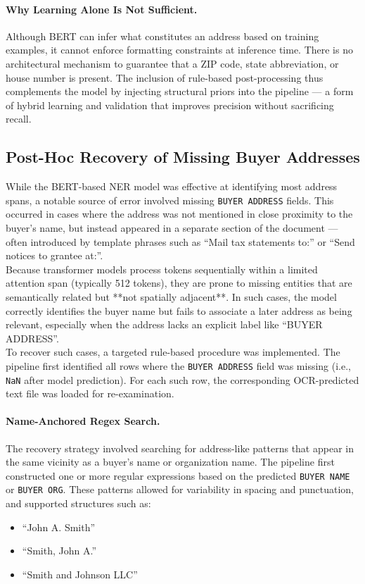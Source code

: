 \documentclass{article}
\begin{document}
\paragraph{Why Learning Alone Is Not Sufficient.}
Although BERT can infer what constitutes an address based on training examples, it cannot enforce formatting constraints at inference time. There is no architectural mechanism to guarantee that a ZIP code, state abbreviation, or house number is present. The inclusion of rule-based post-processing thus complements the model by injecting structural priors into the pipeline — a form of hybrid learning and validation that improves precision without sacrificing recall.

\subsection{Post-Hoc Recovery of Missing Buyer Addresses}

While the BERT-based NER model was effective at identifying most address spans, a notable source of error involved missing \texttt{BUYER ADDRESS} fields. This occurred in cases where the address was not mentioned in close proximity to the buyer's name, but instead appeared in a separate section of the document — often introduced by template phrases such as ``Mail tax statements to:'' or ``Send notices to grantee at:''. \\

Because transformer models process tokens sequentially within a limited attention span (typically 512 tokens), they are prone to missing entities that are semantically related but **not spatially adjacent**. In such cases, the model correctly identifies the buyer name but fails to associate a later address as being relevant, especially when the address lacks an explicit label like ``BUYER ADDRESS''. \\

To recover such cases, a targeted rule-based procedure was implemented. The pipeline first identified all rows where the \texttt{BUYER ADDRESS} field was missing (i.e., \texttt{NaN} after model prediction). For each such row, the corresponding OCR-predicted text file was loaded for re-examination. \\

\paragraph{Name-Anchored Regex Search.}
The recovery strategy involved searching for address-like patterns that appear in the same vicinity as a buyer's name or organization name. The pipeline first constructed one or more regular expressions based on the predicted \texttt{BUYER NAME} or \texttt{BUYER ORG}. These patterns allowed for variability in spacing and punctuation, and supported structures such as:
\begin{itemize}
    \item ``John A. Smith''
    \item ``Smith, John A.''
    \item ``Smith and Johnson LLC''
\end{itemize}
\end{document}
